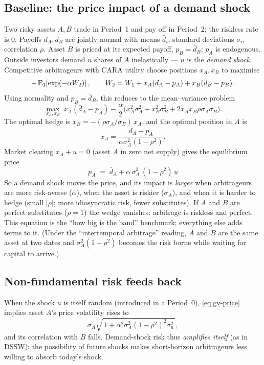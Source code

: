 \subsection*{Baseline: the price impact of a demand shock}
Two risky assets $A,B$ trade in Period~1 and pay off in Period~2; the riskless rate is $0$. Payoffs $d_A,d_B$ are jointly normal with means $\bar d_i$, standard deviations $\sigma_i$, correlation $\rho$. Asset $B$ is priced at its expected payoff, $p_B=\bar d_B$; $p_A$ is endogenous. Outside investors demand $u$ shares of $A$ inelastically --- $u$ is the \emph{demand shock}. Competitive arbitrageurs with CARA utility choose positions $x_A,x_B$ to maximise
\begin{equation}
-\,\mathbb{E}_1\!\left[\exp(-\alpha W_2)\right],\qquad W_2 = W_1 + x_A(d_A-p_A) + x_B(d_B-p_B). \label{eq:gv-obj}
\end{equation}
Using normality and $p_B=\bar d_B$, this reduces to the mean--variance problem
\begin{equation}
\max_{x_A,x_B}\; x_A(\bar d_A - p_A) - \frac{\alpha}{2}\Big(x_A^2\sigma_A^2 + x_B^2\sigma_B^2 + 2x_Ax_B\rho\sigma_A\sigma_B\Big). \label{eq:gv-mv}
\end{equation}
The optimal hedge is $x_B = -(\rho\sigma_A/\sigma_B)\,x_A$, and the optimal position in $A$ is
\begin{equation}
x_A = \frac{\bar d_A - p_A}{\alpha\sigma_A^2(1-\rho^2)}. \label{eq:gv-xA}
\end{equation}
Market clearing $x_A + u = 0$ (asset $A$ in zero net supply) gives the equilibrium price
\begin{equation}
\boxed{\;p_A \;=\; \bar d_A + \alpha\,\sigma_A^2\,(1-\rho^2)\,u\;} \label{eq:gv-price}
\end{equation}
So a demand shock moves the price, and its impact is \emph{larger} when arbitrageurs are more risk-averse ($\alpha$), when the asset is riskier ($\sigma_A$), and when it is harder to hedge (small $|\rho|$; more idiosyncratic risk, fewer substitutes). If $A$ and $B$ are perfect substitutes ($\rho=1$) the wedge vanishes: arbitrage is riskless and perfect. This equation is the ``how big is the band'' benchmark; everything else adds terms to it. (Under the ``intertemporal arbitrage'' reading, $A$ and $B$ are the same asset at two dates and $\sigma_A^2(1-\rho^2)$ becomes the risk borne while waiting for capital to arrive.)

\subsection*{Non-fundamental risk feeds back}
When the shock $u$ is itself random (introduced in a Period~0), \eqref{eq:gv-price} implies asset $A$'s price volatility rises to
\begin{equation}
\sigma_A\sqrt{\,1 + \alpha^2\sigma_A^2(1-\rho^2)^2\sigma_u^2\,}, \label{eq:gv-vol}
\end{equation}
and its correlation with $B$ falls. Demand-shock risk thus \emph{amplifies itself} (as in DSSW): the possibility of future shocks makes short-horizon arbitrageurs less willing to absorb today's shock.

